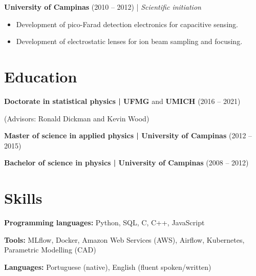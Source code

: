 \documentclass[10pt,a4paper]{article}
\begin{document}
\vspace{4pt}

\textbf{University of Campinas} (2010 -- 2012) | \textit{Scientific initiation} 
\begin{itemize}[noitemsep, topsep=0pt]
	\item Development of pico-Farad detection electronics for capacitive sensing.
	\item Development of electrostatic lenses for ion beam sampling and focusing.
\end{itemize}

\section{Education}

\textbf{Doctorate in statistical physics | UFMG} and \textbf{UMICH} (2016 -- 2021)

(Advisors: Ronald Dickman and Kevin Wood)

\vspace{4pt}

\textbf{Master of science in applied physics | University of Campinas} (2012 -- 2015)

\vspace{2pt}

\textbf{Bachelor of science in physics | University of Campinas} (2008 -- 2012)

\section{Skills}
\textbf{Programming languages:} Python, SQL, C, C++, JavaScript

\vspace{2pt}

\textbf{Tools:} MLflow, Docker, Amazon Web Services (AWS), Airflow, Kubernetes, Parametric Modelling (CAD)

\vspace{2pt}

\textbf{Languages:} Portuguese (native), English (fluent spoken/written) 
\end{document}
